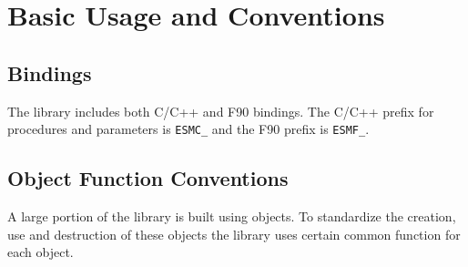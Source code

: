 
\section{Basic Usage and Conventions}

\subsection{Bindings}

The library includes both C/C++ and F90 bindings.  The C/C++ prefix for
procedures and parameters is {\tt ESMC\_} and the F90 prefix is {\tt ESMF\_}.

\subsection{Object Function Conventions}

A large portion of the library is built using objects.  To standardize the
creation, use and destruction of these objects the library uses certain
common function for each object.  

